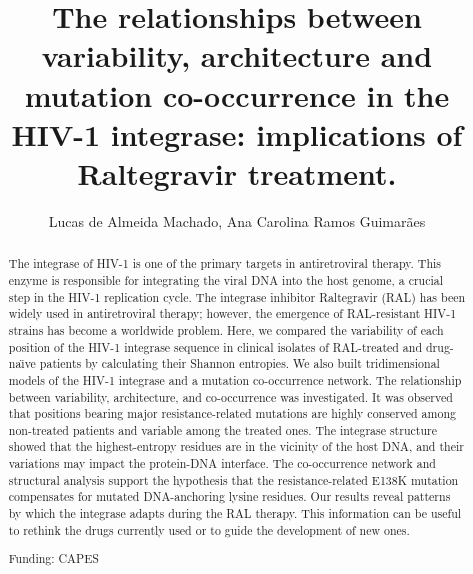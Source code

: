 \documentclass[twoside]{article}
\title{\vspace{-15mm}\fontsize{24pt}{10pt}\selectfont\textbf{ The relationships between variability,  architecture and mutation co-occurrence in the HIV-1 integrase: implications of Raltegravir treatment. }} %
\author{ Lucas de Almeida Machado, Ana Carolina Ramos Guimar\~aes }
\affil{ Fiocruz }
\date{}
\begin{document}
  
  
  \maketitle %
  
  
  \thispagestyle{fancy} %
  
  
  \begin{abstract}
  The integrase of HIV-1 is one of the primary targets in antiretroviral therapy. This enzyme is responsible for integrating the viral DNA into the host genome,  a crucial step in the HIV-1 replication cycle. The integrase inhibitor Raltegravir (RAL) has been widely used in antiretroviral therapy; however,  the emergence of RAL-resistant HIV-1 strains has become a worldwide problem. Here,  we compared the variability of each position of the HIV-1 integrase sequence in clinical isolates of RAL-treated and drug-na\"{\i}ve patients by calculating their Shannon entropies. We also built tridimensional models of the HIV-1 integrase and a mutation co-occurrence network. The relationship between variability,  architecture,  and co-occurrence was investigated. It was observed that positions bearing major resistance-related mutations are highly conserved among non-treated patients and variable among the treated ones. The integrase structure showed that the highest-entropy residues are in the vicinity of the host DNA,  and their variations may impact the protein-DNA interface. The co-occurrence network and structural analysis support the hypothesis that the resistance-related E138K mutation compensates for mutated DNA-anchoring lysine residues. Our results reveal patterns by which the integrase adapts during the RAL therapy. This information can be useful to rethink the drugs currently used or to guide the development of new ones.
  
  Funding: CAPES \\ 
  \end{abstract}
  
\end{document}
